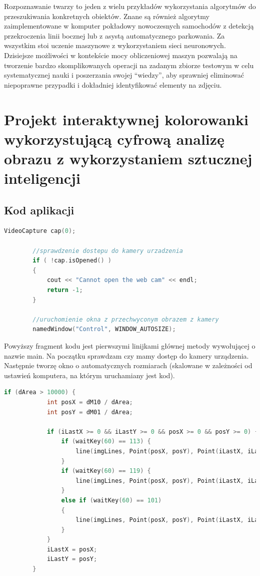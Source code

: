 \documentclass{article}
\begin{document}
	\par
	Rozpoznawanie twarzy to jeden z wielu przykładów wykorzystania algorytmów do przeszukiwania konkretnych obiektów. Znane są również algorytmy zaimplementowane w komputer pokładowy nowoczesnych samochodów z detekcją przekroczenia linii bocznej lub z asystą automatycznego parkowania. Za wszystkim stoi uczenie maszynowe z wykorzystaniem sieci neuronowych. Dzisiejsze możliwości w kontekście mocy obliczeniowej maszyn pozwalają na tworzenie bardzo skomplikowanych operacji na zadanym zbiorze testowym w celu systematycznej nauki i poszerzania swojej “wiedzy”, aby sprawniej eliminować niepoprawne przypadki i dokładniej identyfikować elementy na zdjęciu.
	
	\section{Projekt interaktywnej kolorowanki wykorzystującą cyfrową analizę obrazu z wykorzystaniem sztucznej inteligencji}
	
	\subsection{Kod aplikacji}
	
	\begin{lstlisting}[language=C++, caption=Początek wywołania]
		VideoCapture cap(0);
		
		//sprawdzenie dostepu do kamery urzadzenia
		if ( !cap.isOpened() )
		{
			cout << "Cannot open the web cam" << endl;
			return -1;
		}
		
		//uruchomienie okna z przechwyconym obrazem z kamery
		namedWindow("Control", WINDOW_AUTOSIZE);
	\end{lstlisting}
	
	Powyższy fragment kodu jest pierwszymi linijkami głównej metody wywołującej o nazwie main. Na początku sprawdzam czy mamy dostęp do kamery urządzenia. Następnie tworzę okno o automatycznych rozmiarach (skalowane w zależności od ustawień komputera, na którym uruchamiany jest kod).
	
	\newpage
	
	\begin{lstlisting}[language=C++, caption=Klawisze funkcyjne]
		if (dArea > 10000) {
			int posX = dM10 / dArea;
			int posY = dM01 / dArea;        
			
			if (iLastX >= 0 && iLastY >= 0 && posX >= 0 && posY >= 0) {
				if (waitKey(60) == 113) {
					line(imgLines, Point(posX, posY), Point(iLastX, iLastY), Scalar(0,0,255), 15);
				}
				if (waitKey(60) == 119) {
					line(imgLines, Point(posX, posY), Point(iLastX, iLastY), Scalar(0,255,0), 15); 
				}
				else if (waitKey(60) == 101)
				{
					line(imgLines, Point(posX, posY), Point(iLastX, iLastY), Scalar(0,0,0), 15); 
				}
			}
			iLastX = posX;
			iLastY = posY;
		}
	\end{lstlisting}
	
\end{document}

